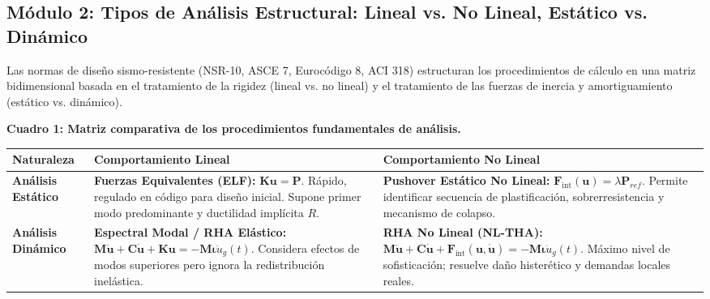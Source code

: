 \documentclass[11pt,letterpaper]{article}
\begin{document}
\subsection{Módulo 2: Tipos de Análisis Estructural: Lineal vs. No Lineal, Estático vs. Dinámico}

\begin{modulebox}
Las normas de diseño sismo-resistente (NSR-10, ASCE 7, Eurocódigo 8, ACI 318) estructuran los procedimientos de cálculo en una matriz bidimensional basada en el tratamiento de la rigidez (lineal vs. no lineal) y el tratamiento de las fuerzas de inercia y amortiguamiento (estático vs. dinámico).

\vspace{0.25cm}
\noindent\textbf{\color{uispurple}Cuadro 1: Matriz comparativa de los procedimientos fundamentales de análisis.}\\[4pt]
\small
\setlength{\tabcolsep}{5pt}
\renewcommand{\arraystretch}{1.3}
\begin{tabularx}{\linewidth}{p{2.5cm} X X}
\toprule
\textbf{Naturaleza} & \textbf{Comportamiento Lineal} & \textbf{Comportamiento No Lineal} \\
\midrule
\textbf{Análisis Estático} & 
\textbf{Fuerzas Equivalentes (ELF):} $\mathbf{K}\mathbf{u} = \mathbf{P}$. Rápido, regulado en código para diseño inicial. Supone primer modo predominante y ductilidad implícita $R$. & 
\textbf{Pushover Estático No Lineal:} $\mathbf{F}_{\text{int}}(\mathbf{u}) = \lambda \mathbf{P}_{ref}$. Permite identificar secuencia de plastificación, sobrerresistencia y mecanismo de colapso. \\
\midrule
\textbf{Análisis Dinámico} & 
\textbf{Espectral Modal / RHA Elástico:} $\mathbf{M}\ddot{\mathbf{u}} + \mathbf{C}\dot{\mathbf{u}} + \mathbf{K}\mathbf{u} = -\mathbf{M}\bm{\iota}\ddot{u}_g(t)$. Considera efectos de modos superiores pero ignora la redistribución inelástica. & 
\textbf{RHA No Lineal (NL-THA):} $\mathbf{M}\ddot{\mathbf{u}} + \mathbf{C}\dot{\mathbf{u}} + \mathbf{F}_{\text{int}}(\mathbf{u},\dot{\mathbf{u}}) = -\mathbf{M}\bm{\iota}\ddot{u}_g(t)$. Máximo nivel de sofisticación; resuelve daño histerético y demandas locales reales. \\
\bottomrule
\end{tabularx}
\vspace{0.25cm}


\end{modulebox}
\end{document}
